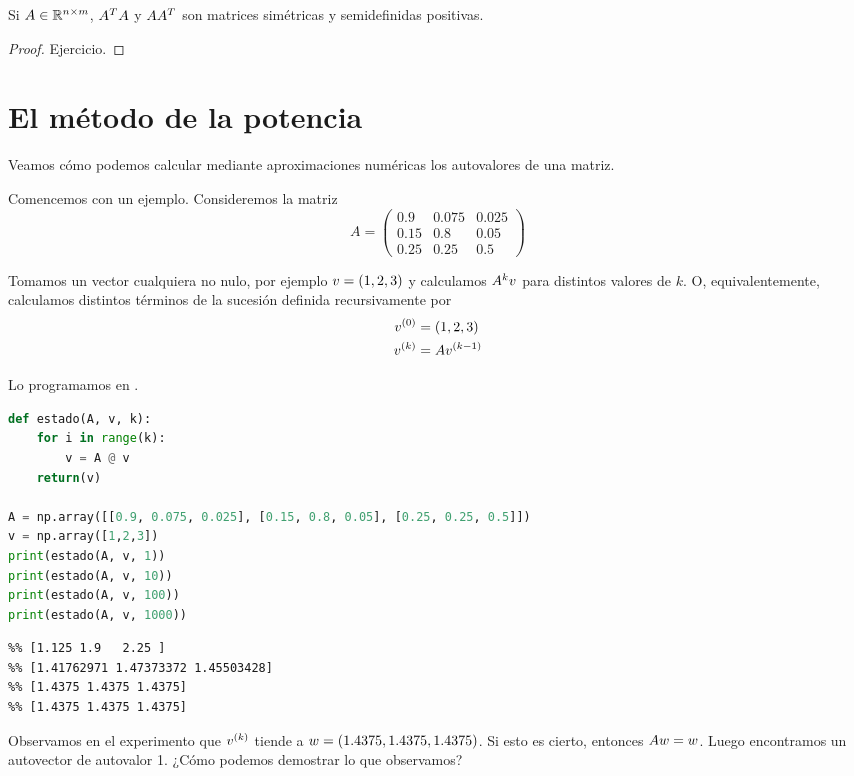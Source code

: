 \begin{prop}
Si $\Ab \in \R^{n \times m}$, $\Ab^T\Ab$ y $\Ab\Ab^T$ son matrices simétricas y semidefinidas positivas.
 \end{prop}

\begin{proof}Ejercicio.\end{proof}

\section{El método de la potencia}

Veamos cómo podemos calcular mediante aproximaciones numéricas los autovalores de una matriz.

Comencemos con un ejemplo. Consideremos la matriz
$$
A = \begin{pmatrix}
0.9 & 0.075 & 0.025 \\
0.15 & 0.8 &  0.05 \\
0.25 & 0.25 & 0.5
\end{pmatrix}
$$

Tomamos un vector cualquiera no nulo, por ejemplo $\vb = (1, 2, 3)$ y calculamos $\Ab^k \vb$ para distintos valores de $k$.
O, equivalentemente, calculamos distintos términos de la sucesión definida recursivamente por
$$
\begin{aligned}
\vb^{(0)} &= (1,2,3) \\
\vb^{(k)} &= \Ab \vb^{(k-1)}
\end{aligned}
$$

Lo programamos en \python.

\begin{Shaded}
\begin{lstlisting}[language=python]
def estado(A, v, k):
    for i in range(k):
        v = A @ v
    return(v)

A = np.array([[0.9, 0.075, 0.025], [0.15, 0.8, 0.05], [0.25, 0.25, 0.5]])
v = np.array([1,2,3])
print(estado(A, v, 1))
print(estado(A, v, 10))
print(estado(A, v, 100))
print(estado(A, v, 1000))
\end{lstlisting}
\end{Shaded}

\begin{verbatim}
%% [1.125 1.9   2.25 ]
%% [1.41762971 1.47373372 1.45503428]
%% [1.4375 1.4375 1.4375]
%% [1.4375 1.4375 1.4375]
\end{verbatim}

Observamos en el experimento que $\vb^{(k)}$ tiende a $\wb = (1.4375, 1.4375, 1.4375)$. Si esto es cierto, entonces $\Ab \wb = \wb$. Luego encontramos un autovector de autovalor 1. ¿C\'omo podemos demostrar lo que observamos?


